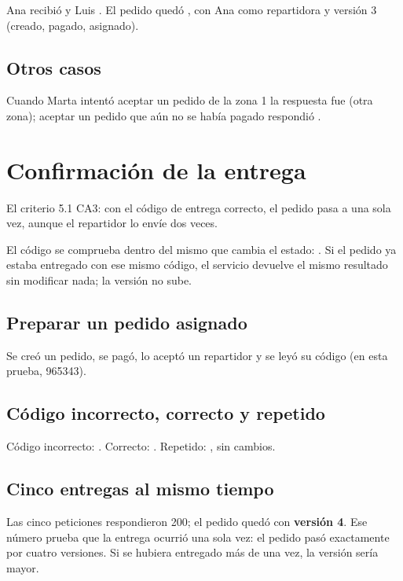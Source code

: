 \documentclass[11pt]{article}
\begin{document}
\observado Ana recibió  y Luis . El pedido quedó , con Ana como
repartidora y versión 3 (creado, pagado, asignado).

\subsection{Otros casos}
Cuando Marta intentó aceptar un pedido de la zona 1 la respuesta fue  (otra zona); aceptar un
pedido que aún no se había pagado respondió .

\section{Confirmación de la entrega}\label{sec:entrega}

\queria El criterio 5.1 CA3: con el código de entrega correcto, el pedido pasa a  una sola
vez, aunque el repartidor lo envíe dos veces.

\comofunciona El código se comprueba dentro del mismo  que cambia el estado:
. Si el pedido ya estaba entregado con ese
mismo código, el servicio devuelve el mismo resultado sin modificar nada; la versión no sube.

\subsection{Preparar un pedido asignado}
Se creó un pedido, se pagó, lo aceptó un repartidor y se leyó su código (en esta prueba, 965343).

\subsection{Código incorrecto, correcto y repetido}
\observado Código incorrecto: . Correcto: . Repetido: , sin cambios.

\subsection{Cinco entregas al mismo tiempo}
\observado Las cinco peticiones respondieron 200; el pedido quedó  con
\textbf{versión 4}. Ese número prueba que la entrega ocurrió una sola vez: el pedido pasó exactamente
por cuatro versiones. Si se hubiera entregado más de una vez, la versión sería mayor.
\end{document}
